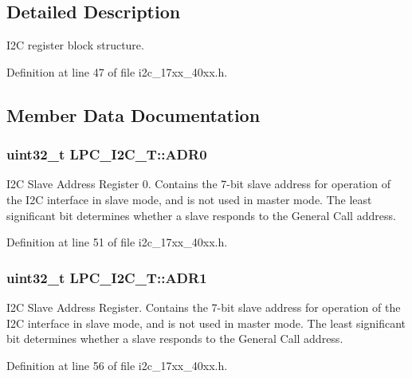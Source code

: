 \subsection{Detailed Description}
I2C register block structure. 

Definition at line 47 of file i2c\+\_\+17xx\+\_\+40xx.\+h.



\subsection{Member Data Documentation}
\subsubsection[{\texorpdfstring{A\+D\+R0}{ADR0}}]{ uint32\+\_\+t L\+P\+C\+\_\+\+I2\+C\+\_\+\+T\+::\+A\+D\+R0}\hypertarget{structLPC__I2C__T_a900e0819e3f450e08a3566caf6f18851}{}\label{structLPC__I2C__T_a900e0819e3f450e08a3566caf6f18851}
I2C Slave Address Register 0. Contains the 7-\/bit slave address for operation of the I2C interface in slave mode, and is not used in master mode. The least significant bit determines whether a slave responds to the General Call address. 

Definition at line 51 of file i2c\+\_\+17xx\+\_\+40xx.\+h.

\subsubsection[{\texorpdfstring{A\+D\+R1}{ADR1}}]{ uint32\+\_\+t L\+P\+C\+\_\+\+I2\+C\+\_\+\+T\+::\+A\+D\+R1}\hypertarget{structLPC__I2C__T_ad948a871ac4d57bde1698f91ea554903}{}\label{structLPC__I2C__T_ad948a871ac4d57bde1698f91ea554903}
I2C Slave Address Register. Contains the 7-\/bit slave address for operation of the I2C interface in slave mode, and is not used in master mode. The least significant bit determines whether a slave responds to the General Call address. 

Definition at line 56 of file i2c\+\_\+17xx\+\_\+40xx.\+h.

